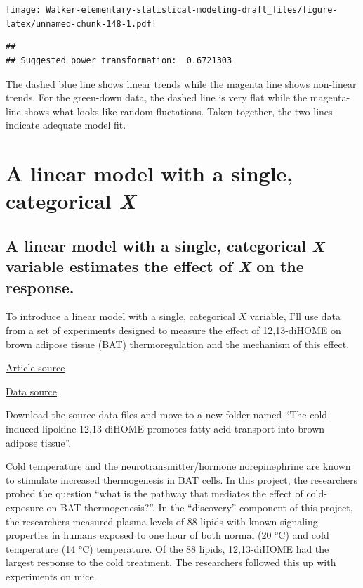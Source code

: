 \documentclass[]{book}
\begin{document}
\texttt{[image: Walker-elementary-statistical-modeling-draft\_files/figure-latex/unnamed-chunk-148-1.pdf]}

\begin{verbatim}
## 
## Suggested power transformation:  0.6721303
\end{verbatim}

The dashed blue line shows linear trends while the magenta line shows non-linear trends. For the green-down data, the dashed line is very flat while the magenta-line shows what looks like random fluctations. Taken together, the two lines indicate adequate model fit.

\hypertarget{a-linear-model-with-a-single-categorical-x}{%
\chapter{\texorpdfstring{A linear model with a single, categorical \emph{X}}{A linear model with a single, categorical X}}\label{a-linear-model-with-a-single-categorical-x}}

\hypertarget{a-linear-model-with-a-single-categorical-x-variable-estimates-the-effect-of-x-on-the-response.}{%
\section{\texorpdfstring{A linear model with a single, categorical \emph{X} variable estimates the effect of \emph{X} on the response.}{A linear model with a single, categorical X variable estimates the effect of X on the response.}}\label{a-linear-model-with-a-single-categorical-x-variable-estimates-the-effect-of-x-on-the-response.}}

To introduce a linear model with a single, categorical \(X\) variable, I'll use data from a set of experiments designed to measure the effect of 12,13-diHOME on brown adipose tissue (BAT) thermoregulation and the mechanism of this effect.

\href{https://www.ncbi.nlm.nih.gov/pmc/articles/PMC5699924/pdf/nihms916046.pdf}{Article source}

\href{https://www.nature.com/articles/nm.4297\#Sec14}{Data source}

Download the source data files and move to a new folder named ``The cold-induced lipokine 12,13-diHOME promotes fatty acid transport into brown adipose tissue''.

Cold temperature and the neurotransmitter/hormone norepinephrine are known to stimulate increased thermogenesis in BAT cells. In this project, the researchers probed the question ``what is the pathway that mediates the effect of cold-exposure on BAT thermogenesis?''. In the ``discovery'' component of this project, the researchers measured plasma levels of 88 lipids with known signaling properties in humans exposed to one hour of both normal (20 °C) and cold temperature (14 °C) temperature. Of the 88 lipids, 12,13-diHOME had the largest response to the cold treatment. The researchers followed this up with experiments on mice.
\end{document}

